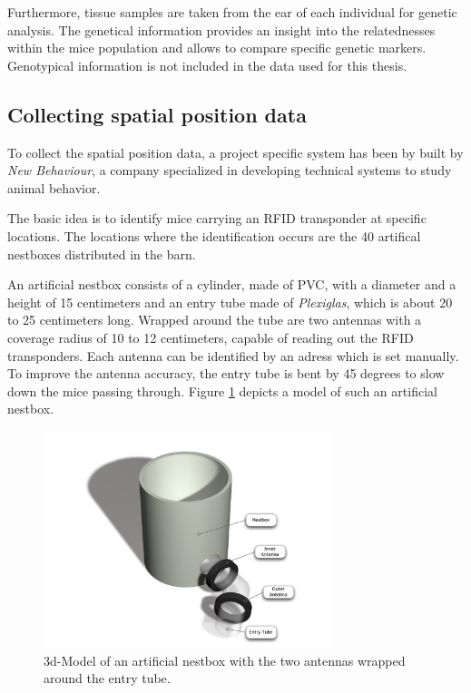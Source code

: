 Furthermore, tissue samples are taken from the ear of each individual for genetic analysis. The genetical information provides an insight into the relatednesses within the mice population and allows to compare specific genetic markers. Genotypical information is not included in the data used for this thesis.

\subsection{Collecting spatial position data}
\label{subsec:collectspatialpos}

To collect the spatial position data, a project specific system has been by built by \textit{New Behaviour}, a company specialized in developing technical systems to study animal behavior. 

The basic idea is to identify mice carrying an RFID transponder at specific locations. The locations where the identification occurs are the 40 artifical nestboxes distributed in the barn. 

An artificial nestbox consists of a cylinder, made of \ac{PVC}, with a diameter and a height of 15 centimeters and an entry tube made of \textit{Plexiglas}, which is about 20 to 25 centimeters long. Wrapped around the tube are two antennas with a coverage radius of 10 to 12 centimeters, capable of reading out the RFID transponders. Each antenna can be identified by an adress which is set manually. To improve the antenna accuracy, the entry tube is bent by 45 degrees to slow down the mice passing through. Figure \ref{fig:artNestbox} depicts a model of such an artificial nestbox.
 
\begin{figure}[htbp]	
\centering	
\includegraphics[width=0.75\textwidth]{assets/pdf/box_schema.pdf}	
\caption[Model of an artificial nestbox]{3d-Model of an artificial nestbox with the two antennas wrapped around the entry tube.}
\label{fig:artNestbox}
\end{figure}

